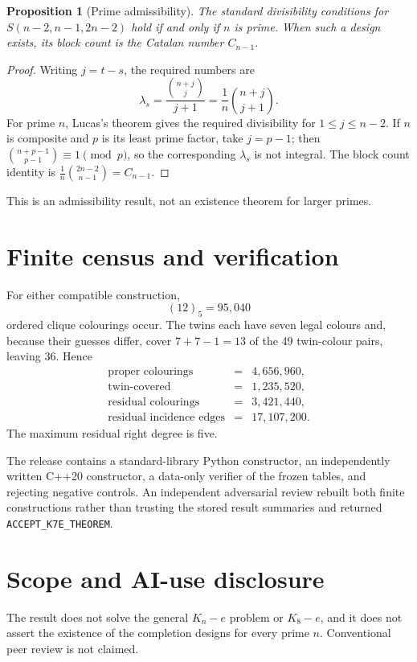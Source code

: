\documentclass[11pt]{article}
\newtheorem{proposition}{Proposition}
\begin{document}
\begin{proposition}[Prime admissibility]\label{prop:prime}
The standard divisibility conditions for $S(n-2,n-1,2n-2)$ hold if and only
if $n$ is prime. When such a design exists, its block count is the Catalan
number $C_{n-1}$.
\end{proposition}
\begin{proof}
Writing $j=t-s$, the required numbers are
\[
 \lambda_s=\frac{\binom{n+j}{j}}{j+1}
          =\frac1n\binom{n+j}{j+1}.
\]
For prime $n$, Lucas's theorem gives the required divisibility for
$1\le j\le n-2$. If $n$ is composite and $p$ is its least prime factor, take
$j=p-1$; then $\binom{n+p-1}{p-1}\equiv1\pmod p$, so the corresponding
$\lambda_s$ is not integral. The block count identity is
$\frac1n\binom{2n-2}{n-1}=C_{n-1}$.
\end{proof}
This is an admissibility result, not an existence theorem for larger primes.

\section{Finite census and verification}
For either compatible construction,
\[
(12)_5=95,040
\]
ordered clique colourings occur. The twins each have seven legal colours and,
because their guesses differ, cover $7+7-1=13$ of the 49 twin-colour pairs,
leaving 36. Hence
\[
\begin{array}{rcl}
\text{proper colourings}&=&4,656,960,\\
\text{twin-covered}&=&1,235,520,\\
\text{residual colourings}&=&3,421,440,\\
\text{residual incidence edges}&=&17,107,200.
\end{array}
\]
The maximum residual right degree is five.

The release contains a standard-library Python constructor, an independently
written C++20 constructor, a data-only verifier of the frozen tables, and
rejecting negative controls. An independent adversarial review rebuilt both
finite constructions rather than trusting the stored result summaries and
returned \texttt{ACCEPT\_K7E\_THEOREM}.

\section*{Scope and AI-use disclosure}
The result does not solve the general $K_n-e$ problem or $K_8-e$, and it does
not assert the existence of the completion designs for every prime $n$.
Conventional peer review is not claimed.
\end{document}

